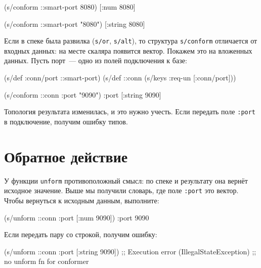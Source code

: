 \begin{english}
  \begin{clojure}
(s/conform ::smart-port 8080)
[:num 8080]

(s/conform ::smart-port "8080")
[:string 8080]
  \end{clojure}
\end{english}


Если в спеке была развилка (\verb|s/or|, \verb|s/alt|), то структура
\verb|s/conform| отличается от входных данных: на месте скаляра появится
вектор. Покажем это на вложенных данных. Пусть порт~--- одно из полей
подключения к базе:

\begin{english}
  \begin{clojure}
(s/def :conn/port ::smart-port)
(s/def ::conn
  (s/keys :req-un [:conn/port]))

(s/conform ::conn {:port "9090"})
{:port [:string 9090]}
  \end{clojure}
\end{english}

Топология результата изменилась, и это нужно учесть. Если передать поле
\verb|:port| в подключение, получим ошибку типов.

\section{Обратное действие}


У функции \verb|unform| противоположный смысл: по спеке и результату она
вернёт исходное значение. Выше мы получили словарь, где поле \verb|:port| это
вектор. Чтобы вернуться к исходным данным, выполните:

\begin{english}
  \begin{clojure}
(s/unform ::conn {:port [:num 9090]})
{:port 9090}
  \end{clojure}
\end{english}

\noindent
Если передать пару со строкой, получим ошибку:

\begin{english}
  \begin{clojure}
(s/unform ::conn {:port [:string 9090]})
;; Execution error (IllegalStateException)
;; no unform fn for conformer
  \end{clojure}
\end{english}

